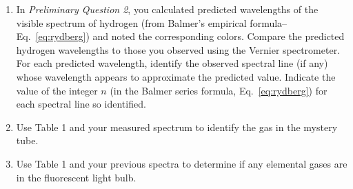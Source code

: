 \begin{enumerate}
\item In \textit{Preliminary Question 2}, you calculated predicted wavelengths
  of the visible spectrum of hydrogen (from Balmer's empirical
  formula--Eq.~\ref{eq:rydberg}) and noted the corresponding colors.  Compare
  the predicted hydrogen wavelengths to those you observed using the Vernier
  spectrometer.  For each predicted wavelength, identify the observed spectral
  line (if any) whose wavelength appears to approximate the predicted value.
  Indicate the value of the integer $n$ (in the Balmer series formula,
  Eq.~\ref{eq:rydberg}) for each spectral line so identified.

\item Use Table 1 and your measured spectrum to identify the gas in the mystery tube.   

\item Use Table 1 and your previous spectra to determine if any elemental gases are in the fluorescent light bulb. 

\end{enumerate}

